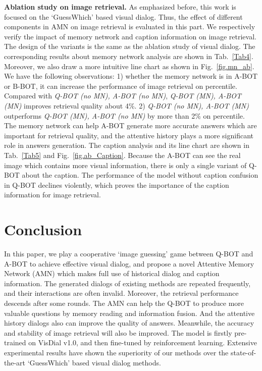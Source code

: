 \documentclass[review]{elsarticle}
\begin{document}
	
	\textbf{Ablation study on image retrieval.} 
	As emphasized before, this work is focused on the `GuessWhich' based visual dialog. Thus, the effect of different components in AMN on image retrieval is evaluated in this part. 
	We respectively verify the impact of memory network and caption information on image retrieval. 
	The design of the variants is the same as the ablation study of visual dialog. The corresponding results about memory network analysis are shown in Tab.~\ref{Tab4}. 
	Moreover, we also draw a more intuitive line chart as shown in Fig.~\ref{fig.mn_ab}.  
	We have the following observations: 1) whether the memory network is in A-BOT or B-BOT, it can increase the performance of image retrieval on percentile. Compared with \emph{Q-BOT (no MN), A-BOT (no MN)}, \emph{Q-BOT (MN), A-BOT (MN)} improves retrieval quality about 4\%.
	2) \emph{Q-BOT (no MN), A-BOT (MN)} outperforms \emph{Q-BOT (MN), A-BOT (no MN)} by more than 2\% on percentile. The memory network can help A-BOT generate more accurate answers which are important for retrieval quality, and the attentive history plays a more significant role in answers generation. 
	The caption analysis and its line chart are shown in Tab.~\ref{Tab5} and Fig.~\ref{fig.ab_Caption}. 
	Because the A-BOT can see the real image which contains more visual information, there is only a single variant of Q-BOT about the caption. 
	The performance of the model without caption confusion in Q-BOT declines violently, which proves the importance of the caption information for image retrieval. 
	

	\section{Conclusion}
	In this paper, we play a cooperative `image guessing' game between Q-BOT and A-BOT to achieve effective visual dialog, and propose a novel Attentive Memory Network (AMN) which makes full use of historical dialog and caption information.
	The generated dialogs of existing methods are repeated frequently, and their interactions are often invalid. Moreover, the retrieval performance descends after some rounds. 
	The AMN can help the Q-BOT to produce more valuable questions by memory reading and information fusion. And the attentive history dialogs also can improve the quality of answers. Meanwhile, the accuracy and stability of image retrieval will also be improved. The model is firstly pre-trained on VisDial v1.0, and then fine-tuned by reinforcement learning. Extensive experimental results have shown the superiority of our methods over the state-of-the-art `GuessWhich' based visual dialog methods.
	

	
\end{document}
